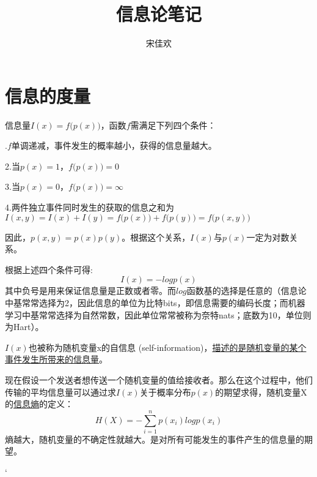 \documentclass[UTF8]{ctexart} %
\title{信息论笔记}
\author{宋佳欢}
\begin{document}
	\maketitle
	\tableofcontents
	\songti {}
	
	\section{信息的度量}
		信息量$I(x)=f\big(p(x)\big)$，函数$f$需满足下列四个条件：
		
		.$f$单调递减，事件发生的概率越小，获得的信息量越大。
		
		\quad2.当$p(x)=1$，$f\big(p(x)\big)=0$
		
		\quad3.当$p(x)=0$，$f\big(p(x)\big)=\infty$
		
		\quad4.两件独立事件同时发生的获取的信息之和为$I(x,y)=I(x)+I(y)=f\big(p(x)\big)+f\big(p(y)\big)=f\big(p(x,y)\big)$
		
		因此，$p(x,y)=p(x)p(y)$。根据这个关系，$I(x)$与$p(x)$一定为对数关系。
		
		根据上述四个条件可得:\[I(x)=-logp(x)\]
		其中负号是用来保证信息量是正数或者零。而$log$函数基的选择是任意的（信息论中基常常选择为2，因此信息的单位为比特bits，即信息需要的编码长度；而机器学习中基常常选择为自然常数，因此单位常常被称为奈特nats；底数为10，单位则为Hart）。
		
		$I(x)$也被称为随机变量x的自信息 (self-information)，\uline{描述的是随机变量的某个事件发生所带来的信息量}。
		
		现在假设一个发送者想传送一个随机变量的值给接收者。那么在这个过程中，他们传输的平均信息量可以通过求$I(x)$关于概率分布$p(x)$的期望求得，随机变量X的\uline{信息熵}的定义：
		\[H(X)= -\sum_{i=1}^np(x_i)logp(x_i)\]
		熵越大，随机变量的不确定性就越大。是对所有可能发生的事件产生的信息量的期望。

		`
	
	
		
\end{document}
